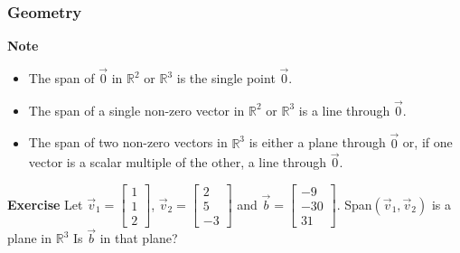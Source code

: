   \begin{frame}[fragile]\frametitle{Geometry}
\textbf{Note}
\begin{itemize}
\item The span of $\vec{0}$ in $\mathbb R^2$ or $\mathbb R^3$ is the single point $\vec{0}$.
\item The span of a single non-zero vector in $\mathbb R^2$ or $\mathbb R^3$ is a line through $\vec{0}$.
\item The span of two non-zero vectors in $\mathbb R^3$ is either a plane through $\vec{0}$ or, if one
vector is a scalar multiple of the other, a line through $\vec{0}$.
\end{itemize}


\textbf{Exercise}
Let $\vec{v}_1 = \left[\begin{array}{r}1 \\ 1 \\ 2 \end{array}\right]$, 
$\vec{v}_2 = \left[\begin{array}{r} 2 \\ 5 \\ -3 \end{array}\right]$ and 
$\vec{b} = \left[\begin{array}{r} -9 \\ -30 \\ 31 \end{array}\right]$.
Span$(\vec{v}_1,\vec{v}_2)$ is a plane in $\mathbb R^3$  Is $\vec{b}$ in that plane?

\end{frame}

